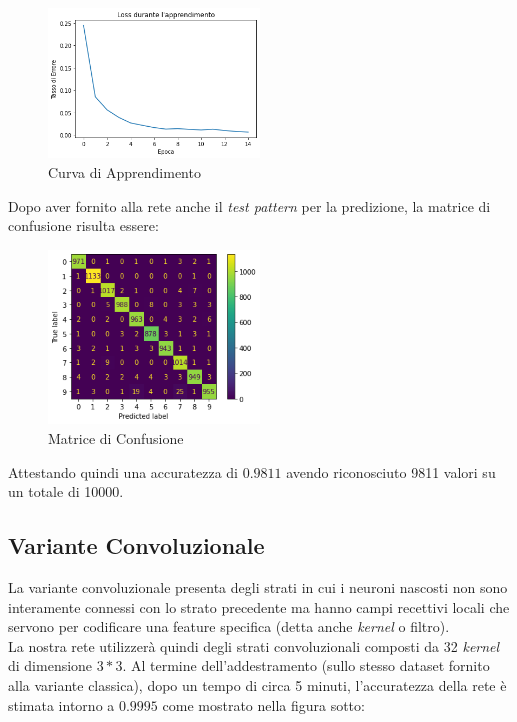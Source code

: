 \documentclass[12pt, a4paper]{article}
\begin{document}
\begin{figure}[h]
    \centering
    \includegraphics[width=0.50\textwidth]{CurvaApprendimentoClassica}
    \caption{Curva di Apprendimento}
\end{figure}

Dopo aver fornito alla rete anche il \textit{test pattern} per la predizione, la matrice di confusione risulta essere:

\begin{figure}[h]
    \centering
    \includegraphics[width=0.50\textwidth]{MatriceConfusioneClassica}
    \caption{Matrice di Confusione}
\end{figure}

Attestando quindi una accuratezza di \(0.9811\) avendo riconosciuto 9811 valori su un totale di 10000.


\subsection{Variante Convoluzionale}
La variante convoluzionale presenta degli strati in cui i neuroni nascosti non sono interamente connessi con lo strato precedente ma hanno campi recettivi locali che servono per codificare una feature specifica (detta anche \textit{kernel} o filtro).\\
La nostra rete utilizzerà quindi degli strati convoluzionali composti da 32 \textit{kernel} di dimensione \(3*3\).
Al termine dell'addestramento (sullo stesso dataset fornito alla variante classica), dopo un tempo di circa 5 minuti, l'accuratezza della rete è stimata intorno a \(0.9995\) come mostrato nella figura sotto:
\end{document}
